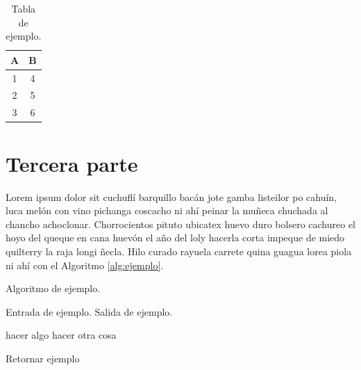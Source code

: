 \begin{table}[!ht]
	\centering
	\caption{Tabla de ejemplo.}
	\begin{tabular}{| c | c |}
		\hline
		A & B \\ \hline
		1 & 4 \\
		2 & 5 \\
		3 & 6 \\\hline
	\end{tabular}
	\label{tab:ejemplo}
\end{table}

\section{Tercera parte}
\label{sec:tercera}

Lorem ipsum dolor sit cuchufl\'i barquillo bac\'an jote gamba listeilor po cahu\'in, luca mel\'on con vino pichanga coscacho ni ah\'i peinar la muñeca chuchada al chancho achoclonar. Chorrocientos pituto ubicatex huevo duro bolsero cachureo el hoyo del queque en cana huev\'on el año del loly hacerla corta impeque de miedo quilterry la raja longi ñecla. Hilo curado rayuela carrete quina guagua lorea piola ni ah\'i con el Algoritmo \ref{alg:ejemplo}.

\begin{algorithm}[!ht]
	\caption{Algoritmo de ejemplo.}
	\label{alg:ejemplo}
	\begin{algorithmic}[1]
	\REQUIRE Entrada de ejemplo.
	\ENSURE Salida de ejemplo.	
	
		\STATE hacer algo
	\ELSE
		\STATE hacer otra cosa
	\ENDIF
	
	\RETURN Retornar ejemplo
	
	\end{algorithmic}
\end{algorithm}